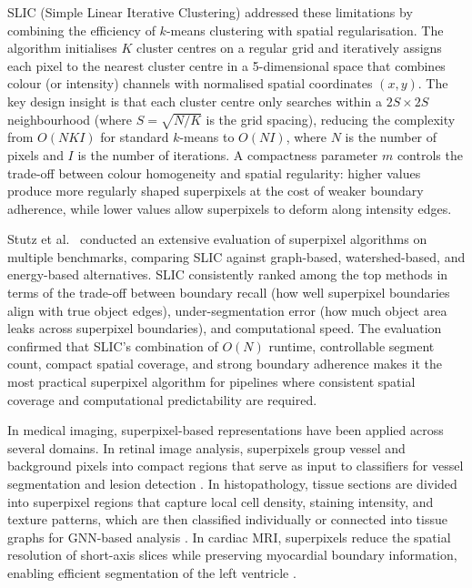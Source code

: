 \documentclass{article}
\begin{document}
SLIC (Simple Linear Iterative Clustering) \cite{achanta2012slic} addressed
these limitations by combining the efficiency of $k$-means clustering with
spatial regularisation. The algorithm initialises $K$ cluster centres on a
regular grid and iteratively assigns each pixel to the nearest cluster centre
in a 5-dimensional space that combines colour (or intensity) channels with
normalised spatial coordinates $(x, y)$. The key design insight is that each
cluster centre only searches within a $2S \times 2S$ neighbourhood (where
$S = \sqrt{N/K}$ is the grid spacing), reducing the complexity from $O(NKI)$
for standard $k$-means to $O(NI)$, where $N$ is the number of pixels and $I$
is the number of iterations. A compactness parameter $m$ controls the trade-off
between colour homogeneity and spatial regularity: higher values produce more
regularly shaped superpixels at the cost of weaker boundary adherence, while
lower values allow superpixels to deform along intensity edges.

Stutz et al.\ \cite{stutz2018superpixels} conducted an extensive evaluation of
superpixel algorithms on multiple benchmarks, comparing SLIC against
graph-based, watershed-based, and energy-based alternatives. SLIC consistently
ranked among the top methods in terms of the trade-off between boundary recall
(how well superpixel boundaries align with true object edges), under-segmentation
error (how much object area leaks across superpixel boundaries), and
computational speed. The evaluation confirmed that SLIC's combination of
$O(N)$ runtime, controllable segment count, compact spatial coverage, and
strong boundary adherence makes it the most practical superpixel algorithm for
pipelines where consistent spatial coverage and computational predictability
are required.

In medical imaging, superpixel-based representations have been applied across
several domains. In retinal image analysis, superpixels group vessel and
background pixels into compact regions that serve as input to classifiers for
vessel segmentation and lesion detection \cite{orlando2017retinal}. In
histopathology, tissue sections are divided into superpixel regions that
capture local cell density, staining intensity, and texture patterns, which
are then classified individually or connected into tissue graphs for GNN-based
analysis \cite{jha2021instance}. In cardiac MRI, superpixels reduce the
spatial resolution of short-axis slices while preserving myocardial boundary
information, enabling efficient segmentation of the left ventricle
\cite{bai2019superpixel}.
\end{document}
